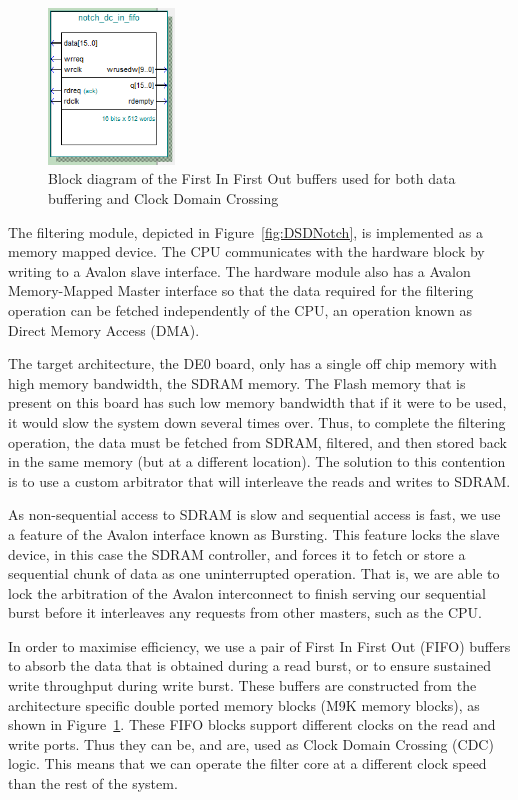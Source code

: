 \documentclass[]{article}
\begin{document}
\begin{figure}[htbp]
	\begin{center}
		\includegraphics[width = 0.3\textwidth]{fifoBlock.PNG}
	\end{center}
	\caption{Block diagram of the First In First Out buffers used for both data buffering and Clock Domain Crossing}
	\label{fig:fifoblock}
\end{figure}

The filtering module, depicted in Figure~\ref{fig:DSDNotch}, is implemented as a memory mapped device. The CPU communicates with the hardware block by writing to a Avalon slave interface.
The hardware module also has a Avalon Memory-Mapped Master interface so that the data required for the filtering operation can be fetched independently of the CPU, an operation known as Direct Memory Access (DMA).

The target architecture, the DE0 board, only has a single off chip memory with high memory bandwidth, the SDRAM memory. The Flash memory that is present on this board has such low memory bandwidth that if it were to be used, it would slow the system down several times over.
Thus, to complete the filtering operation, the data must be fetched from SDRAM, filtered, and then stored back in the same memory (but at a different location). The solution to this contention is to use a custom arbitrator that will interleave the reads and writes to SDRAM.

As non-sequential access to SDRAM is slow and sequential access is fast, we use a feature of the Avalon interface known as Bursting. This feature locks the slave device, in this case the SDRAM controller, and forces it to fetch or store a sequential chunk of data as one uninterrupted operation.
That is, we are able to lock the arbitration of the Avalon interconnect to finish serving our sequential burst before it interleaves any requests from other masters, such as the CPU.

In order to maximise efficiency, we use a pair of First In First Out (FIFO) buffers to absorb the data that is obtained during a read burst, or to ensure sustained write throughput during write burst.
These buffers are constructed from the architecture specific double ported memory blocks (M9K memory blocks), as shown in Figure~\ref{fig:fifoblock}.
These FIFO blocks support different clocks on the read and write ports. Thus they can be, and are, used as Clock Domain Crossing (CDC) logic. This means that we can operate the filter core at a different clock speed than the rest of the system.
\end{document}
